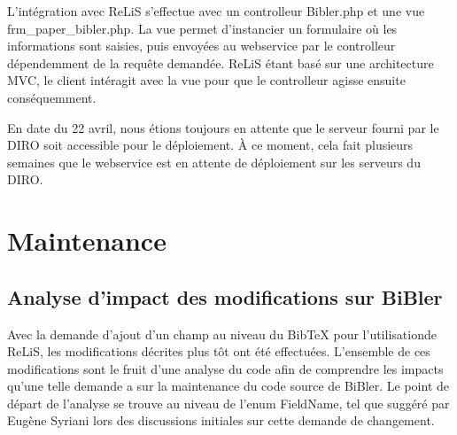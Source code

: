 \documentclass[12pt,titlepage]{article}
\let\oldsection\section
\renewcommand\section{\clearpage\oldsection}
\begin{document}
L'intégration avec ReLiS s'effectue avec un controlleur Bibler.php et une vue frm\_paper\_bibler.php. La vue permet d'instancier un formulaire où les informations sont saisies, puis envoyées au webservice par le controlleur dépendemment de la requête demandée. ReLiS étant basé sur une architecture MVC, le client intéragit avec la vue pour que le controlleur agisse ensuite conséquemment. 

En date du 22 avril, nous étions toujours en attente que le serveur fourni par le DIRO soit accessible pour le déploiement. À ce moment, cela fait plusieurs semaines que le webservice est en attente de déploiement sur les serveurs du DIRO. \newline

\section{Maintenance}
\subsection{Analyse d'impact des modifications sur BiBler}
Avec la demande d'ajout d'un champ au niveau du BibTeX pour l'utilisationde ReLiS, les modifications décrites plus tôt ont été effectuées. L'ensemble de ces modifications sont le fruit d'une analyse du code afin de comprendre les impacts qu'une telle demande a sur la maintenance du code source de BiBler. Le point de départ de l'analyse se trouve au niveau de l'enum FieldName, tel que suggéré par Eugène Syriani lors des discussions initiales sur cette demande de changement. \newline
\end{document}
